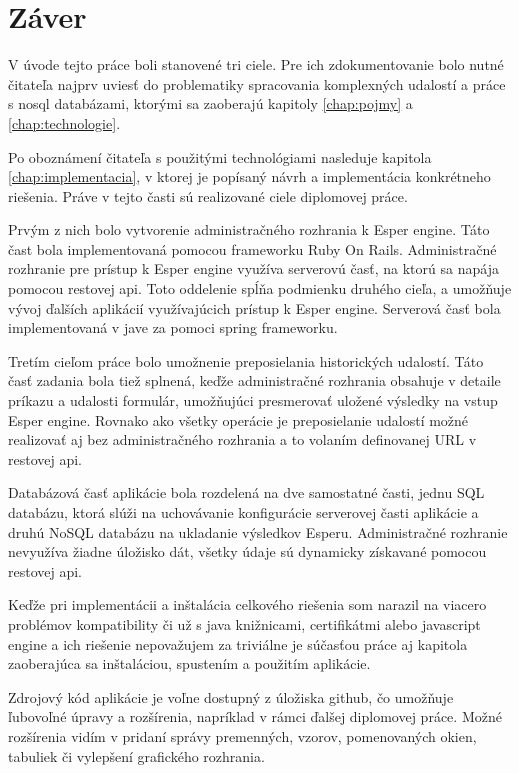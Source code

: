 \chapter*{Záver}

V úvode tejto práce boli stanovené tri ciele. Pre ich zdokumentovanie bolo nutné čitateľa najprv uviesť do problematiky spracovania komplexných udalostí a práce s nosql databázami, ktorými sa zaoberajú kapitoly \ref{chap:pojmy} a \ref{chap:technologie}.

Po oboznámení čitateľa s použitými technológiami nasleduje kapitola \ref{chap:implementacia}, v ktorej je popísaný návrh a implementácia konkrétneho riešenia. Práve v tejto časti sú realizované ciele diplomovej práce.

Prvým z nich bolo vytvorenie administračného rozhrania k Esper engine. Táto čast bola implementovaná pomocou frameworku Ruby On Rails. Administračné rozhranie pre prístup k Esper engine využíva serverovú časť, na ktorú sa napája pomocou restovej api. Toto oddelenie spĺňa podmienku druhého cieľa, a umožňuje vývoj ďalších aplikácií využívajúcich prístup k Esper engine. Serverová časť bola implementovaná v jave za pomoci spring frameworku.

Tretím cieľom práce bolo umožnenie preposielania historických udalostí. Táto časť zadania bola tiež splnená, keďže administračné rozhrania obsahuje v detaile príkazu a udalosti formulár, umožňujúci presmerovať uložené výsledky na vstup Esper engine. Rovnako ako všetky operácie je preposielanie udalostí možné realizovať aj bez administračného rozhrania a to volaním definovanej URL v restovej api.

Databázová časť aplikácie bola rozdelená na dve samostatné časti, jednu SQL databázu, ktorá slúži na uchovávanie konfigurácie serverovej časti aplikácie a druhú NoSQL databázu na ukladanie výsledkov Esperu. Administračné rozhranie nevyužíva žiadne úložisko dát, všetky údaje sú dynamicky získavané pomocou restovej api.

Keďže pri implementácii a inštalácia celkového riešenia som narazil na viacero problémov kompatibility či už s java knižnicami, certifikátmi alebo javascript engine a ich riešenie nepovažujem za triviálne je súčasťou práce aj kapitola zaoberajúca sa inštaláciou, spustením a použitím aplikácie.

Zdrojový kód aplikácie je voľne dostupný z úložiska github, čo umožňuje ľubovoľné úpravy a rozšírenia, napríklad v rámci ďalšej diplomovej práce. Možné rozšírenia vidím v pridaní správy premenných, vzorov, pomenovaných okien, tabuliek či vylepšení grafického rozhrania.

\emptydoublepage
